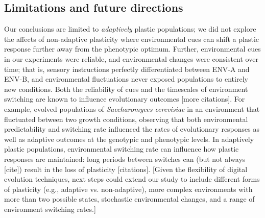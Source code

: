 
\vspace{0.25cm}
\subsection{Limitations and future directions}

Our conclusions are limited to \textit{adaptively} plastic populations; we did not explore the affects of non-adaptive plasticity where environmental cues can shift a plastic response further away from the phenotypic optimum.
Further, environmental cues in our experiments were reliable, and environmental changes were consistent over time; that is, sensory instructions perfectly differentiated between ENV-A and ENV-B, and environmental fluctuations never exposed populations to entirely new conditions.
Both the reliability of cues and the timescales of environment switching are known to influence evolutionary outcomes \citep{li_digital_2004,boyer_adaptation_2021} [more citations].
For example, \cite{boyer_adaptation_2021} evolved populations of \textit{Saccharomyces cerevisiae} in an environment that fluctuated between two growth conditions, observing that both environmental predictability and switching rate influenced the rates of evolutionary responses as well as adaptive outcomes at the genotypic and phenotypic levels. %
In adaptively plastic populations, environmental switching rate can influence how plastic responses are maintained: long periods between switches can (but not always [cite]) result in the loss of plasticity [citations].
[Given the flexibility of digital evolution techniques, next steps could extend our study to include different forms of plasticity (e.g., adaptive vs. non-adaptive), more complex environments with more than two possible states, stochastic environmental changes, and a range of environment switching rates.]

